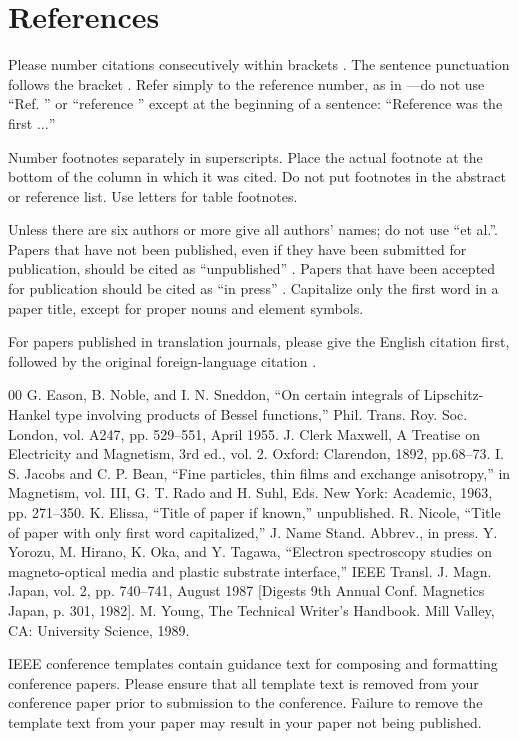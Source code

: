 \documentclass[conference]{IEEEtran}
\begin{document}
\section*{References}

Please number citations consecutively within brackets \cite{b1}. The 
sentence punctuation follows the bracket \cite{b2}. Refer simply to the reference 
number, as in \cite{b3}---do not use ``Ref. \cite{b3}'' or ``reference \cite{b3}'' except at 
the beginning of a sentence: ``Reference \cite{b3} was the first $\ldots$''

Number footnotes separately in superscripts. Place the actual footnote at 
the bottom of the column in which it was cited. Do not put footnotes in the 
abstract or reference list. Use letters for table footnotes.

Unless there are six authors or more give all authors' names; do not use 
``et al.''. Papers that have not been published, even if they have been 
submitted for publication, should be cited as ``unpublished'' \cite{b4}. Papers 
that have been accepted for publication should be cited as ``in press'' \cite{b5}. 
Capitalize only the first word in a paper title, except for proper nouns and 
element symbols.

For papers published in translation journals, please give the English 
citation first, followed by the original foreign-language citation \cite{b6}.

\begin{thebibliography}{00}
 G. Eason, B. Noble, and I. N. Sneddon, ``On certain integrals of Lipschitz-Hankel type involving products of Bessel functions,'' Phil. Trans. Roy. Soc. London, vol. A247, pp. 529--551, April 1955.
 J. Clerk Maxwell, A Treatise on Electricity and Magnetism, 3rd ed., vol. 2. Oxford: Clarendon, 1892, pp.68--73.
 I. S. Jacobs and C. P. Bean, ``Fine particles, thin films and exchange anisotropy,'' in Magnetism, vol. III, G. T. Rado and H. Suhl, Eds. New York: Academic, 1963, pp. 271--350.
 K. Elissa, ``Title of paper if known,'' unpublished.
 R. Nicole, ``Title of paper with only first word capitalized,'' J. Name Stand. Abbrev., in press.
 Y. Yorozu, M. Hirano, K. Oka, and Y. Tagawa, ``Electron spectroscopy studies on magneto-optical media and plastic substrate interface,'' IEEE Transl. J. Magn. Japan, vol. 2, pp. 740--741, August 1987 [Digests 9th Annual Conf. Magnetics Japan, p. 301, 1982].
 M. Young, The Technical Writer's Handbook. Mill Valley, CA: University Science, 1989.
\end{thebibliography}
\vspace{12pt}
\color{red}
IEEE conference templates contain guidance text for composing and formatting conference papers. Please ensure that all template text is removed from your conference paper prior to submission to the conference. Failure to remove the template text from your paper may result in your paper not being published.
\end{document}
